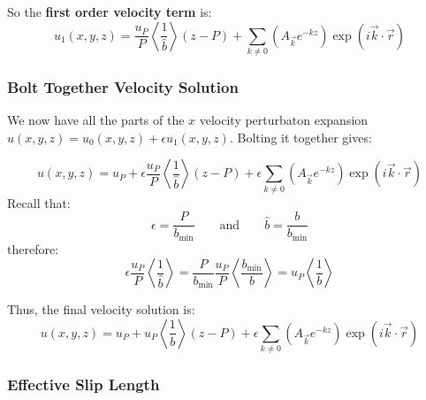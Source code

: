 \documentclass[12pt, a4paper, twoside, openright]{book}
\newcommand{\bmin}{\ensuremath{b_{\mathrm{min}}}}
\begin{document}
\vspace{1em}
So the \textbf{first order velocity term} is:
\begin{equation}
u_1(x,y,z) =  \frac{u_P}{P} \left< \frac{1}{\hat{b}} \right> (z - P)
 + \sum_{k \neq 0} 
\left(  A_{\vec{k}} e^{-kz} \right)
\exp(i \vec{k}\cdot \vec{r})
\end{equation}


\subsubsection*{Bolt Together Velocity Solution}
We now have all the parts of the $x$ velocity perturbaton expansion $u(x,y,z) = u_0(x,y,z) + \epsilon u_1(x,y,z)$.  Bolting it together gives:

\begin{equation}
u(x,y,z) = u_P
 + \epsilon \frac{u_P}{P} \left< \frac{1}{\hat{b}} \right> (z - P)
 +  \epsilon \sum_{k \neq 0} 
\left(  A_{\vec{k}} e^{-kz} \right)
\exp(i \vec{k}\cdot \vec{r})
\end{equation}
Recall that:
\begin{equation}
\epsilon = \frac{P}{\bmin} \qquad \text{and} \qquad
\hat{b} = \frac{b}{\bmin}
\end{equation}
therefore:
\begin{equation}
\epsilon \frac{u_P}{P} \left< \frac{1}{\hat{b}} \right> 
= \frac{P}{\bmin} \frac{u_P}{P} \left< \frac{\bmin}{b} \right> 
= u_P \left< \frac{1}{b} \right>
\end{equation}

Thus, the final velocity solution is:
\begin{equation}
u(x,y,z) = u_P
 + u_P\left< \frac{1}{b} \right> (z - P)
 +  \epsilon \sum_{k \neq 0} 
\left(  A_{\vec{k}} e^{-kz} \right)
\exp(i \vec{k}\cdot \vec{r})
\end{equation}

\subsubsection*{Effective Slip Length}
\end{document}
